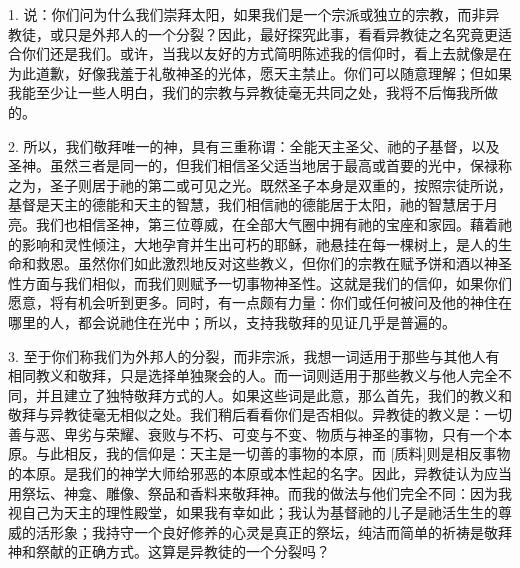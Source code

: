 1. 说：你们问为什么我们崇拜太阳，如果我们是一个宗派或独立的宗教，而非异教徒，或只是外邦人的一个分裂？因此，最好探究此事，看看异教徒之名究竟更适合你们还是我们。或许，当我以友好的方式简明陈述我的信仰时，看上去就像是在为此道歉，好像我羞于礼敬神圣的光体，愿天主禁止。你们可以随意理解；但如果我能至少让一些人明白，我们的宗教与异教徒毫无共同之处，我将不后悔我所做的。\par

2. 所以，我们敬拜唯一的神，具有三重称谓：全能天主圣父、祂的子基督，以及圣神。虽然三者是同一的，但我们相信圣父适当地居于最高或首要的光中，保禄称之为，圣子则居于祂的第二或可见之光。既然圣子本身是双重的，按照宗徒所说，基督是天主的德能和天主的智慧，我们相信祂的德能居于太阳，祂的智慧居于月亮。我们也相信圣神，第三位尊威，在全部大气圈中拥有祂的宝座和家园。藉着祂的影响和灵性倾注，大地孕育并生出可朽的耶稣，祂悬挂在每一棵树上，是人的生命和救恩。虽然你们如此激烈地反对这些教义，但你们的宗教在赋予饼和酒以神圣性方面与我们相似，而我们则赋予一切事物神圣性。这就是我们的信仰，如果你们愿意，将有机会听到更多。同时，有一点颇有力量：你们或任何被问及他的神住在哪里的人，都会说祂住在光中；所以，支持我敬拜的见证几乎是普遍的。\par

3. 至于你们称我们为外邦人的分裂，而非宗派，我想一词适用于那些与其他人有相同教义和敬拜，只是选择单独聚会的人。而一词则适用于那些教义与他人完全不同，并且建立了独特敬拜方式的人。如果这些词是此意，那么首先，我们的教义和敬拜与异教徒毫无相似之处。我们稍后看看你们是否相似。异教徒的教义是：一切善与恶、卑劣与荣耀、衰败与不朽、可变与不变、物质与神圣的事物，只有一个本原。与此相反，我的信仰是：天主是一切善的事物的本原，而 [质料]则是相反事物的本原。是我们的神学大师给邪恶的本原或本性起的名字。因此，异教徒认为应当用祭坛、神龛、雕像、祭品和香料来敬拜神。而我的做法与他们完全不同：因为我视自己为天主的理性殿堂，如果我有幸如此；我认为基督祂的儿子是祂活生生的尊威的活形象；我持守一个良好修养的心灵是真正的祭坛，纯洁而简单的祈祷是敬拜神和祭献的正确方式。这算是异教徒的一个分裂吗？\par

